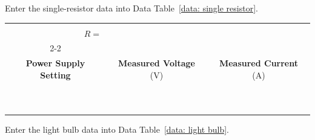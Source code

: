 \documentclass[addpoints]{physlabs}
\begin{document}
\begin{postlab}



    \filbreak
    \question[\half] Enter the single-resistor data into Data Table~\ref{data: single resistor}.

    \begin{center}
        \captionsetup{font=normalsize}
        \renewcommand{\arraystretch}{1.3}
        \begin{tabular}{|c|c|c|}
            \multicolumn{3}{c}{}
            \\
            \multicolumn{1}{r}{$R=$} & \multicolumn{1}{c}{} & \multicolumn{1}{c}{}
            \\
            \cline{2-2}
            \multicolumn{3}{c}{}
            \\
            \hline
            \rowcolor{gray!20}
            \textbf{Power Supply Setting} & \textbf{Measured Voltage} (V) & \textbf{Measured Current} (A)
            \\
            \hline
            & & \\ \hline
            & & \\ \hline
            & & \\ \hline
            & & \\ \hline
            & & \\ \hline
            & & \\ \hline
            & & \\ \hline
            & & \\ \hline
            & & \\ \hline
            & & \\ \hline
        \end{tabular}
    \end{center}

    \filbreak
    \question[\half] Enter the light bulb data into Data Table~\ref{data: light bulb}.


\end{postlab}
\end{document}
